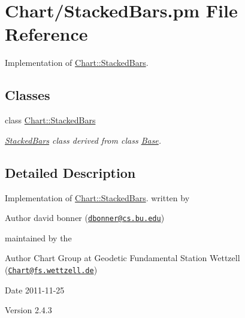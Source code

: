 \hypertarget{StackedBars_8pm}{
\section{Chart/StackedBars.pm File Reference}
\label{StackedBars_8pm}
}


Implementation of \hyperlink{classChart_1_1StackedBars}{Chart::StackedBars}.  


\subsection*{Classes}
\begin{DoxyCompactItemize}
\item 
class \hyperlink{classChart_1_1StackedBars}{Chart::StackedBars}
\begin{DoxyCompactList}\small\item\em \hyperlink{classChart_1_1StackedBars}{StackedBars} class derived from class \hyperlink{classChart_1_1Base}{Base}. \item\end{DoxyCompactList}\end{DoxyCompactItemize}


\subsection{Detailed Description}
Implementation of \hyperlink{classChart_1_1StackedBars}{Chart::StackedBars}. written by \begin{DoxyAuthor}{Author}
david bonner (\href{mailto:dbonner@cs.bu.edu}{\tt dbonner@cs.bu.edu})
\end{DoxyAuthor}
maintained by the \begin{DoxyAuthor}{Author}
Chart Group at Geodetic Fundamental Station Wettzell (\href{mailto:Chart@fs.wettzell.de}{\tt Chart@fs.wettzell.de}) 
\end{DoxyAuthor}
\begin{DoxyDate}{Date}
2011-\/11-\/25 
\end{DoxyDate}
\begin{DoxyVersion}{Version}
2.4.3 
\end{DoxyVersion}
